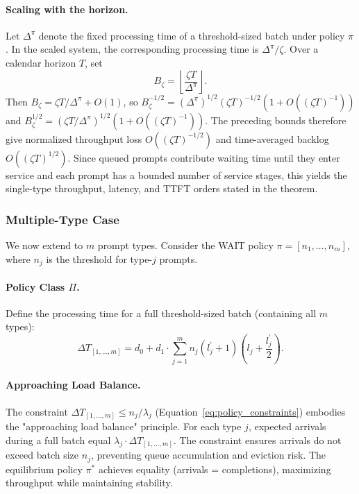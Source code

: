 \paragraph{Scaling with the horizon.} Let \(\Delta^\pi\) denote the fixed processing time of a threshold-sized batch under policy \(\pi\). In the scaled system, the corresponding processing time is \(\Delta^\pi/\zeta\). Over a calendar horizon \(T\), set
\[
    B_\zeta=\left\lfloor \frac{\zeta T}{\Delta^\pi}\right\rfloor .
\]
Then \(B_\zeta=\zeta T/\Delta^\pi+O(1)\), so \(B_\zeta^{-1/2}=(\Delta^\pi)^{1/2}(\zeta T)^{-1/2}(1+O((\zeta T)^{-1}))\) and \(B_\zeta^{1/2}=(\zeta T/\Delta^\pi)^{1/2}(1+O((\zeta T)^{-1}))\). The preceding bounds therefore give normalized throughput loss \(O((\zeta T)^{-1/2})\) and time-averaged backlog \(O((\zeta T)^{1/2})\). Since queued prompts contribute waiting time until they enter service and each prompt has a bounded number of service stages, this yields the single-type throughput, latency, and TTFT orders stated in the theorem.

\subsubsection{Multiple-Type Case}

We now extend to $m$ prompt types. Consider the WAIT policy $\pi = [n_1,\ldots,n_m]$, where $n_j$ is the threshold for type-$j$ prompts.

\paragraph{Policy Class $\Pi$.} Define the processing time for a full threshold-sized batch (containing all \(m\) types):
\begin{equation}\label{eq:batch_time_def}
\Delta T_{[1,\ldots,m]} =  d_0 + d_1 \cdot \sum_{j=1}^m n_j(l_j^\prime+1)\left( l_j+\frac{l_j^\prime}{2} \right).
\end{equation}

\paragraph{Approaching Load Balance.}
The constraint $\Delta T_{[1,\ldots,m]} \leq n_j/\lambda_j$ (Equation~\ref{eq:policy_constraints}) embodies the "approaching load balance" principle. For each type $j$, expected arrivals during a full batch equal $\lambda_j \cdot \Delta T_{[1,\ldots,m]}$. The constraint ensures arrivals do not exceed batch size $n_j$, preventing queue accumulation and eviction risk. The equilibrium policy $\pi^*$ achieves equality (arrivals = completions), maximizing throughput while maintaining stability.

